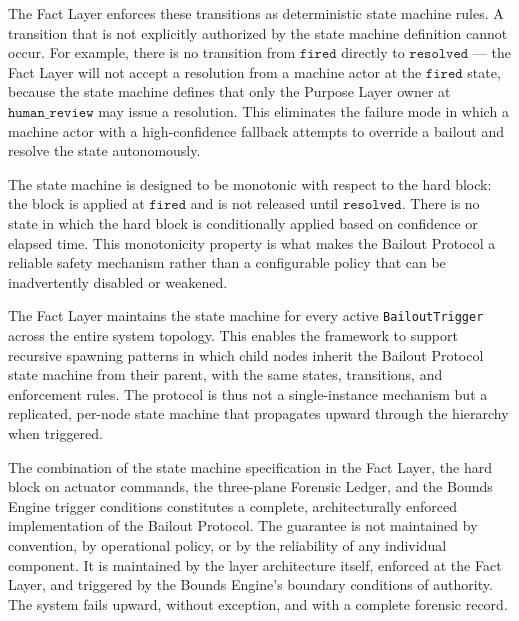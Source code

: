 The Fact Layer enforces these transitions as deterministic state machine rules. A transition that is not explicitly authorized by the state machine definition cannot occur. For example, there is no transition from $\texttt{fired}$ directly to $\texttt{resolved}$ --- the Fact Layer will not accept a resolution from a machine actor at the $\texttt{fired}$ state, because the state machine defines that only the Purpose Layer owner at $\texttt{human\_review}$ may issue a resolution. This eliminates the failure mode in which a machine actor with a high-confidence fallback attempts to override a bailout and resolve the state autonomously.

The state machine is designed to be monotonic with respect to the hard block: the block is applied at $\texttt{fired}$ and is not released until $\texttt{resolved}$. There is no state in which the hard block is conditionally applied based on confidence or elapsed time. This monotonicity property is what makes the Bailout Protocol a reliable safety mechanism rather than a configurable policy that can be inadvertently disabled or weakened.

The Fact Layer maintains the state machine for every active \texttt{BailoutTrigger} across the entire system topology. This enables the framework to support recursive spawning patterns in which child nodes inherit the Bailout Protocol state machine from their parent, with the same states, transitions, and enforcement rules. The protocol is thus not a single-instance mechanism but a replicated, per-node state machine that propagates upward through the hierarchy when triggered.

The combination of the state machine specification in the Fact Layer, the hard block on actuator commands, the three-plane Forensic Ledger, and the Bounds Engine trigger conditions constitutes a complete, architecturally enforced implementation of the Bailout Protocol. The guarantee is not maintained by convention, by operational policy, or by the reliability of any individual component. It is maintained by the layer architecture itself, enforced at the Fact Layer, and triggered by the Bounds Engine's boundary conditions of authority. The system fails upward, without exception, and with a complete forensic record.